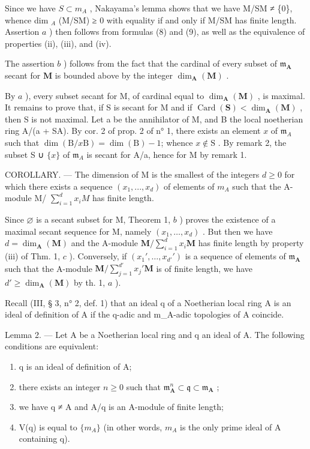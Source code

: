 Since we have \(S \subset m_{A}\) , Nakayama's lemma shows that we have M/SM ≠ \{0\}, whence dim \(_{A}\) (M/SM) ≥ 0 with equality if and only if M/SM has finite length. Assertion \(a\) ) then follows from formulas (8) and (9), as well as the equivalence of properties (ii), (iii), and (iv).

The assertion \(b\) ) follows from the fact that the cardinal of every subset of \(\mathfrak{m}_{\mathbf{A}}\) secant for \(\mathbf{M}\) is bounded above by the integer \(\dim_{\mathbf{A}}(\mathbf{M})\) .

By \(a\) ), every subset secant for M, of cardinal equal to \(\dim_{\mathbf{A}}(\mathbf{M})\) , is maximal. It remains to prove that, if S is secant for M and if \(\operatorname{Card}(\mathbf{S}) < \dim_{\mathbf{A}}(\mathbf{M})\) , then S is not maximal. Let a be the annihilator of M, and B the local noetherian ring A/(a + SA). By cor. 2 of prop. 2 of n° 1, there exists an element \(x\) of \(\mathfrak{m}_{A}\) such that \(\dim(\mathrm{B}/x\mathrm{B}) = \dim(\mathrm{B}) - 1\); whence \(x \notin \mathrm{S}\) . By remark 2, the subset S ∪ \(\{x\}\) of \(\mathfrak{m}_{A}\) is secant for A/a, hence for M by remark 1.

COROLLARY. --- The dimension of M is the smallest of the integers \(d \geqslant 0\) for which there exists a sequence \((x_{1}, ..., x_{d})\) of elements of \(m_{A}\) such that the A-module M/ \(\sum_{i=1}^{d} x_{i}M\) has finite length.

Since \(\varnothing\) is a secant subset for M, Theorem 1, \(b\) ) proves the existence of a maximal secant sequence for M, namely \((x_{1},\ldots,x_{d})\) . But then we have \(d=\dim_{\mathbf{A}}(\mathbf{M})\) and the A-module \(\mathbf{M}/\sum_{i=1}^{d}x_{i}\mathbf{M}\) has finite length by property (iii) of Thm. 1, \(c\) ). Conversely, if \((x_{1}',\ldots,x_{d'}')\) is a sequence of elements of \(\mathfrak{m}_{\mathbf{A}}\) such that the A-module \(\mathbf{M}/\sum_{j=1}^{d'}x_{j}'\mathbf{M}\) is of finite length, we have \(d'\geqslant\dim_{\mathbf{A}}(\mathbf{M})\) by th. 1, \(a\) ).

Recall (III, § 3, n° 2, def. 1) that an ideal q of a Noetherian local ring A is an ideal of definition of A if the q-adic and m\_A-adic topologies of A coincide.

Lemma 2. --- Let A be a Noetherian local ring and q an ideal of A. The following conditions are equivalent:

\begin{enumerate}
\def\labelenumi{(\roman{enumi})}
\item
  q is an ideal of definition of A;
\item
  there exists an integer \(n \geqslant 0\) such that \(\mathfrak{m}_{\mathbf{A}}^{n} \subset \mathfrak{q} \subset \mathfrak{m}_{\mathbf{A}}\) ;
\item
  we have q ≠ A and A/q is an A-module of finite length;
\item
  V(q) is equal to \(\{m_{A}\}\) (in other words, \(m_{A}\) is the only prime ideal of A containing q).
\end{enumerate}

